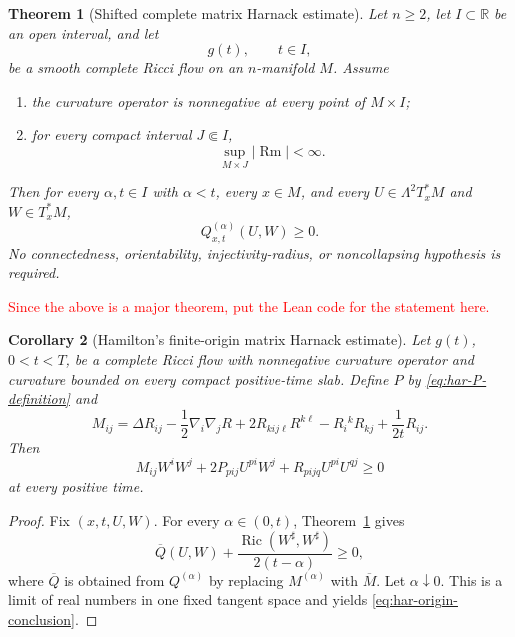 \documentclass[10pt]{coll-l}
\newtheorem{theorem}{Theorem}[chapter]
\newtheorem{corollary}[theorem]{Corollary}
\theoremstyle{definition}
\theoremstyle{remark}
\numberwithin{section}{chapter}
\numberwithin{equation}{chapter}
\newcommand{\Ric}{\operatorname{Ric}}
\newcommand{\Rm}{\operatorname{Rm}}
\begin{document}
\begin{theorem}[Shifted complete matrix Harnack estimate]
\label{thm:har-shifted-matrix}
Let $n\geq2$, let $I\subset\mathbb R$ be an open interval, and let
\[
                         g(t),\qquad t\in I,
\]
be a smooth complete Ricci flow on an $n$-manifold $M$.  Assume
\begin{enumerate}
\item the curvature operator is nonnegative at every point of $M\times I$;
\item for every compact interval $J\Subset I$,
      \begin{equation}
          \sup_{M\times J}|\Rm|<\infty.                 \label{eq:har-slab-bound}
      \end{equation}
\end{enumerate}
Then for every $\alpha,t\in I$ with $\alpha<t$, every $x\in M$, and every
$U\in\Lambda^2T_x^*M$ and $W\in T_x^*M$,
\begin{equation}
                         Q^{(\alpha)}_{x,t}(U,W)\geq0.   \label{eq:har-shifted-conclusion}
\end{equation}
No connectedness, orientability, injectivity-radius, or noncollapsing
hypothesis is required.
\end{theorem}

\textcolor{red}{Since the above is a major theorem, put the Lean code for the statement here.}

\begin{corollary}[Hamilton's finite-origin matrix Harnack estimate]
\label{cor:har-finite-origin}
Let $g(t)$, $0<t<T$, be a complete Ricci flow with nonnegative curvature
operator and curvature bounded on every compact positive-time slab.  Define
$P$ by \eqref{eq:har-P-definition} and
\begin{equation}
 M_{ij}=\Delta R_{ij}-\frac12\nabla_i\nabla_jR
      +2R_{kij\ell}R^{k\ell}-R_i{}^kR_{kj}
      +\frac1{2t}R_{ij}.                                \label{eq:har-M-origin}
\end{equation}
Then
\begin{equation}
 M_{ij}W^iW^j+2P_{pij}U^{pi}W^j+R_{pijq}U^{pi}U^{qj}
       \geq0                                             \label{eq:har-origin-conclusion}
\end{equation}
at every positive time.
\end{corollary}

\begin{proof}
Fix $(x,t,U,W)$.  For every $\alpha\in(0,t)$,
Theorem~\ref{thm:har-shifted-matrix} gives
\[
 \overline Q(U,W)+\frac{\Ric(W^\sharp,W^\sharp)}{2(t-\alpha)}\geq0,
\]
where $\overline Q$ is obtained from $Q^{(\alpha)}$ by replacing
$M^{(\alpha)}$ with $\overline M$.  Let $\alpha\downarrow0$.  This is a
limit of real numbers in one fixed tangent space and yields
\eqref{eq:har-origin-conclusion}.
\end{proof}
\end{document}
